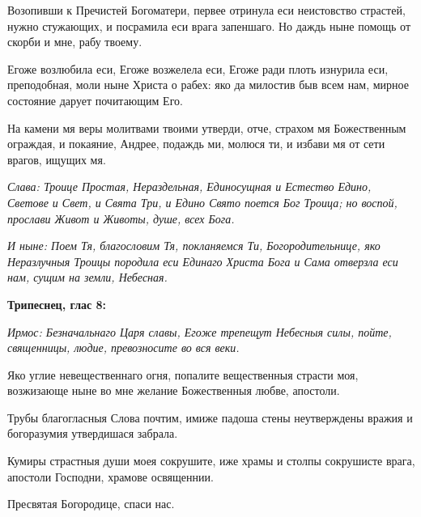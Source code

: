 

Возопивши к Пречистей Богоматери, первее отринула еси неистовство страстей, нужно стужающих, и посрамила еси врага запеншаго. Но даждь ныне помощь от скорби и мне, рабу твоему.




Егоже возлюбила еси, Егоже возжелела еси, Егоже ради плоть изнурила еси, преподобная, моли ныне Христа о рабех: яко да милостив быв всем нам, мирное состояние дарует почитающим Его.




На камени мя веры молитвами твоими утверди, отче, страхом мя Божественным ограждая, и покаяние, Андрее, подаждь ми, молюся ти, и избави мя от сети врагов, ищущих мя.


\itshape Слава\normalfont{}: Троице Простая, Нераздельная, Единосущная и Естество Едино, Светове и Свет, и Свята Три, и Едино Свято поется Бог Троица; но воспой, прослави Живот и Животы, душе, всех Бога.


\itshape И ныне\normalfont{}: Поем Тя, благословим Тя, покланяемся Ти, Богородительнице, яко Неразлучныя Троицы породила еси Единаго Христа Бога и Сама отверзла еси нам, сущим на земли, Небесная. 


\medskip\bfseries Трипеснец, глас 8:

\normalfont{}




\itshape Ирмос\normalfont{}: Безначальнаго Царя славы, Егоже трепещут Небесныя силы, пойте, священницы, людие, превозносите во вся веки.




Яко углие невещественнаго огня, попалите вещественныя страсти моя, возжизающе ныне во мне желание Божественныя любве, апостоли.




Трубы благогласныя Слова почтим, имиже падоша стены неутверждены вражия и богоразумия утвердишася забрала.




Кумиры страстныя души моея сокрушите, иже храмы и столпы сокрушисте врага, апостоли Господни, храмове освященнии.


Пресвятая Богородице, спаси нас.


